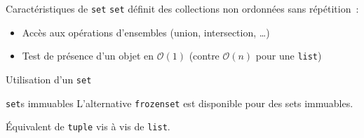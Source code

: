 \begin{frame}{Caractéristiques de \texttt{set}}
  \texttt{set} définit des collections non ordonnées sans répétition~:
  \begin{itemize}[<+->]
    \item Accès aux opérations d'ensembles (union, intersection, …)
    \item Test de présence d'un objet en $\mathcal{O}(1)$ (contre $\mathcal{O}(n)$ pour une \texttt{list})
  \end{itemize}
\end{frame}

\begin{frame}{Utilisation d'un \texttt{set}}
\end{frame}

\begin{frame}{\texttt{set}s immuables}
  L'alternative \texttt{frozenset} est disponible pour des sets immuables.

  Équivalent de \texttt{tuple} vis à vis de \texttt{list}.
\end{frame}
